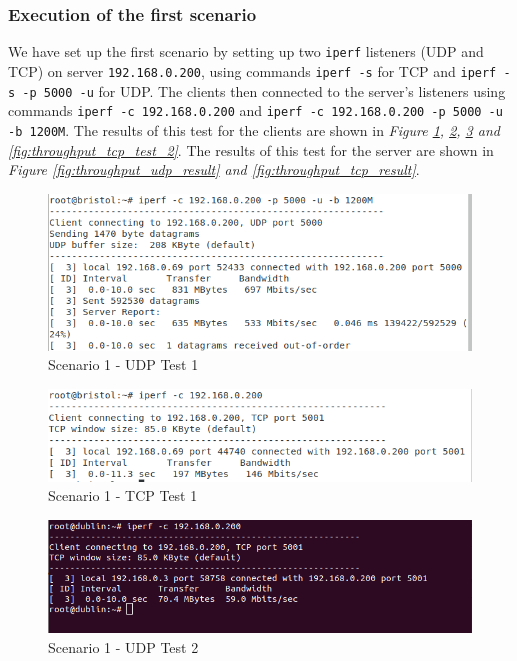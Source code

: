 \documentclass{article}
\begin{document}
\subsubsection{Execution of the first scenario}
We have set up the first scenario by setting up two \texttt{iperf} listeners (UDP and TCP) on server \texttt{192.168.0.200}, using commands \texttt{iperf -s} for TCP and \texttt{iperf -s -p 5000 -u} for UDP. The clients then connected to the server's listeners using commands \texttt{iperf -c 192.168.0.200} and \texttt{iperf -c 192.168.0.200 -p 5000 -u -b 1200M}. The results of this test for the clients are shown in \textit{Figure \ref{fig:throughput_udp_test_1}, \ref{fig:throughput_tcp_test_1}, \ref{fig:throughput_udp_test_2} and \ref{fig:throughput_tcp_test_2}}. The results of this test for the server are shown in \textit{Figure \ref{fig:throughput_udp_result} and \ref{fig:throughput_tcp_result}}.

\begin{figure}[H]
\includegraphics[width=14cm]{figures/q2-2-1-udp-1.png}
\centering
\caption{Scenario 1 - UDP Test 1}
\centering
\label{fig:throughput_udp_test_1}
\end{figure}


\begin{figure}[H]
\includegraphics[width=14cm]{figures/q2-2-1-tcp-1.png}
\centering
\caption{Scenario 1 - TCP Test 1}
\centering
\label{fig:throughput_tcp_test_1}
\end{figure}


\begin{figure}[H]
\includegraphics[width=14cm]{figures/q2-2-1-udp-2.png}
\centering
\caption{Scenario 1 - UDP Test 2}
\centering
\label{fig:throughput_udp_test_2}
\end{figure}
\end{document}
